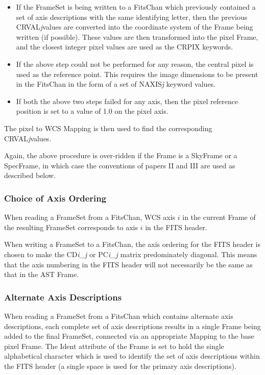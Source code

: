 \documentclass[twoside,11pt]{article}
\begin{document}
\begin{itemize}
\item If the FrameSet is being written to a FitsChan which previously
contained a set of axis descriptions with the same identifying letter, 
then the previous CRVAL\emph{j}values are converted into the coordinate system 
of the Frame being written (if possible). These values are then
transformed into the pixel Frame, and the closest integer pixel values
are used as the CRPIX keywords.
\item If the above step could not be performed for any reason, the
central pixel is used as the reference point. This requires the image 
dimensions to be present in the FitsChan in the form of a set of
NAXIS\emph{j} keyword values.
\item If both the above two steps failed for any axis, then the pixel
reference position is set to a value of 1.0 on the pixel axis.
\end{itemize}

The pixel to WCS Mapping is then used to find the corresponding
CRVAL\emph{j}values.

Again, the above procedure is over-ridden if the Frame is a
SkyFrame or a SpecFrame, in which 
case the conventions of papers II and III are used as described below.


\subsubsection{Choice of Axis Ordering}
When reading a FrameSet from a
FitsChan, WCS axis $i$ in the current
Frame of the
resulting FrameSet corresponds to axis $i$ in the FITS header.

When writing a FrameSet to a FitsChan, the axis ordering for the FITS
header is chosen to make the CD\emph{i\_j} or PC\emph{i\_j} matrix
predominately diagonal. This means that the axis numbering in the FITS
header will not necessarily be the same as that in the AST Frame.

\subsubsection{Alternate Axis Descriptions}
When reading a FrameSet from a
FitsChan which contains alternate axis descriptions,
each complete set of axis descriptions results in a single Frame being added 
to the final FrameSet, connected via an appropriate 
Mapping to the base pixel Frame. The Ident attribute of the Frame is set to hold the single alphabetical 
character which is used to identify the set of axis descriptions within 
the FITS header (a single space is used for the primary axis descriptions).
\end{document}
